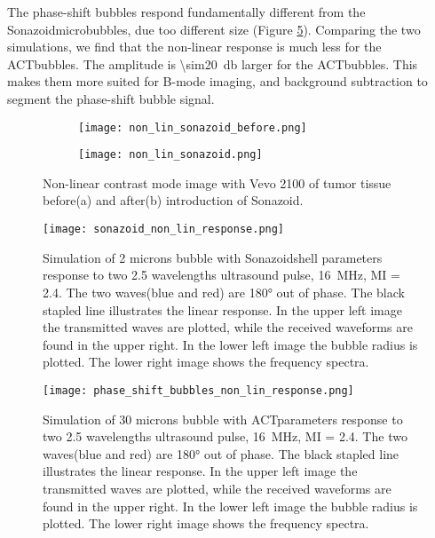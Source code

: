 The phase-shift bubbles respond fundamentally different from the Sonazoid\texttrademark microbubbles, due too different size (Figure \ref{Fig:PS_non_lin_response}). Comparing the two simulations, we find that the non-linear response is much less for the ACT\texttrademark bubbles. The amplitude is \SI{\sim20}{\decibel} larger for the ACT\texttrademark bubbles. This makes them more suited for B-mode imaging, and background subtraction to segment the phase-shift bubble signal.
\begin{figure}
	\centering
	\begin{subfigure}[b]{0.55\textwidth}
		\texttt{[image: non\_lin\_sonazoid\_before.png]}
		\caption{}
		\label{fig:Ng1} 
	\end{subfigure}
	
	\begin{subfigure}[b]{0.55\textwidth}
		\texttt{[image: non\_lin\_sonazoid.png]}
		\caption{}
		\label{fig:Ng2}
	\end{subfigure}
	\caption{Non-linear contrast mode image with Vevo 2100 of tumor tissue before(a) and after(b) introduction of Sonazoid\texttrademark.}
	\label{Fig:Sonazoid non-lin}
\end{figure}

\begin{figure}
	\texttt{[image: sonazoid\_non\_lin\_response.png]}
	\caption{Simulation of 2 microns bubble with Sonazoid\texttrademark shell parameters response to two \num{2.5} wavelengths ultrasound pulse,  \SI{16}{\mega\hertz}, MI = \num{2.4}. The two waves(blue and red) are \ang{180} out of phase. The black stapled line illustrates the linear response. In the upper left image the transmitted waves are plotted, while the received waveforms are found in the upper right. In the lower left image the bubble radius is plotted. The lower right image shows the frequency spectra.} 
	\label{Fig:sonazoid_non_lin_response}
\end{figure}
\begin{figure}
	\texttt{[image: phase\_shift\_bubbles\_non\_lin\_response.png]}
	\caption{Simulation of 30 microns bubble with ACT\texttrademark parameters response to two \num{2.5} wavelengths ultrasound pulse,  \SI{16}{\mega\hertz}, MI = \num{2.4}. The two waves(blue and red) are \ang{180} out of phase. The black stapled line illustrates the linear response. In the upper left image the transmitted waves are plotted, while the received waveforms are found in the upper right. In the lower left image the bubble radius is plotted. The lower right image shows the frequency spectra.} 
	\label{Fig:PS_non_lin_response}
\end{figure}

